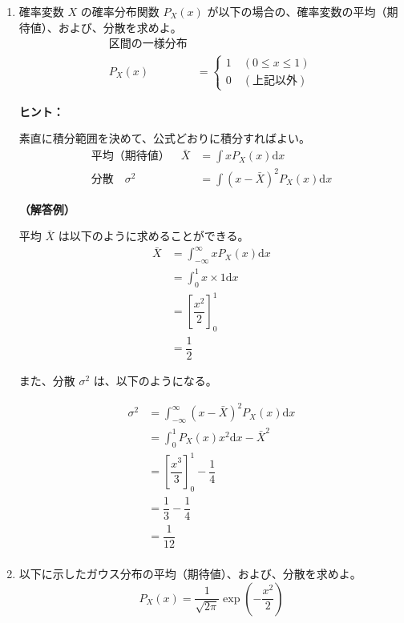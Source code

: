 \documentclass[uplatex,dvipdfmx,a4paper,11pt]{jsarticle}
\newcommand{\diff}{\mathrm d}
\begin{document}
\begin{enumerate}
\setlength{\parskip}{0cm} %
\setlength{\itemsep}{0.5cm} %
\item
確率変数 $X$ の確率分布関数 $P_X(x)$ が以下の場合の、確率変数の平均（期待値）、および、分散を求めよ。
\begin{align*}
[0,1] \text{区間の一様分布}& \\
P_X(x) &=
\begin{cases}
1 \quad (0 \leq x \leq 1)　\\
0 \quad (\text{上記以外})
\end{cases}
\end{align*}

\begin{itembox}[l]{{\bf ヒント：}}

素直に積分範囲を決めて、公式どおりに積分すればよい。
\begin{align*}
平均（期待値）\quad \bar{X} &= \displaystyle \int x P_X(x) \diff x \\
分散 \quad \sigma^2 &= \displaystyle \int \left(x-\bar{X} \right)^2 P_X(x) \diff x
\end{align*}

\end{itembox}

{\bf （解答例）}

平均 $\bar{X}$ は以下のように求めることができる。
\begin{align*}
\bar{X} 
	&= \int_{-\infty}^{\infty} x P_X(x) \diff x \\
	&= \int_0^1 x \times 1 \diff x \\
	&= \left[ \dfrac{x^2}{2} \right]_0^1 \\
	&= \dfrac{1}{2}
\end{align*}

また、分散 $\sigma^2$ は、以下のようになる。

\begin{align*}
\sigma^2 
	&= \int_{-\infty}^{\infty} (x - \bar{X})^2 P_X(x) \diff x \\
	&= \int_{0}^{1} P_X(x) x^2 \diff x - \bar{X}^2 \\
	&= \left[ \dfrac{x^3}{3} \right]_{0}^{1} - \dfrac{1}{4} \\
	&= \dfrac{1}{3} - \dfrac{1}{4} \\
	&= \dfrac{1}{12} \\
\end{align*}

\newpage

\item
以下に示したガウス分布の平均（期待値）、および、分散を求めよ。
\begin{equation*}
P_X(x) = \dfrac{1}{\sqrt{2 \pi}} \exp \left(-\dfrac{x^2}{2} \right)
\end{equation*}


\end{enumerate}
\end{document}
